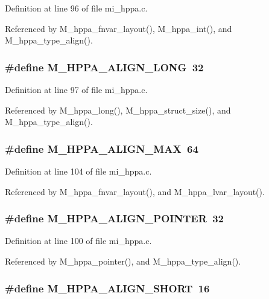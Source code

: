 Definition at line 96 of file mi\_\-hppa.c.

Referenced by M\_\-hppa\_\-fnvar\_\-layout(), M\_\-hppa\_\-int(), and M\_\-hppa\_\-type\_\-align().
\subsubsection{\setlength{\rightskip}{0pt plus 5cm}\#define M\_\-HPPA\_\-ALIGN\_\-LONG~32}\label{mi__hppa_8c_b4c1728f4992209f45afed4689feca52}




Definition at line 97 of file mi\_\-hppa.c.

Referenced by M\_\-hppa\_\-long(), M\_\-hppa\_\-struct\_\-size(), and M\_\-hppa\_\-type\_\-align().
\subsubsection{\setlength{\rightskip}{0pt plus 5cm}\#define M\_\-HPPA\_\-ALIGN\_\-MAX~64}\label{mi__hppa_8c_a1c1893a6082c4bcfb09af522f11f6b3}




Definition at line 104 of file mi\_\-hppa.c.

Referenced by M\_\-hppa\_\-fnvar\_\-layout(), and M\_\-hppa\_\-lvar\_\-layout().
\subsubsection{\setlength{\rightskip}{0pt plus 5cm}\#define M\_\-HPPA\_\-ALIGN\_\-POINTER~32}\label{mi__hppa_8c_d92336c5e84c44a4de16383f666e4bb7}




Definition at line 100 of file mi\_\-hppa.c.

Referenced by M\_\-hppa\_\-pointer(), and M\_\-hppa\_\-type\_\-align().
\subsubsection{\setlength{\rightskip}{0pt plus 5cm}\#define M\_\-HPPA\_\-ALIGN\_\-SHORT~16}\label{mi__hppa_8c_1ad1443c590e65cdee2e588f36a42611}




